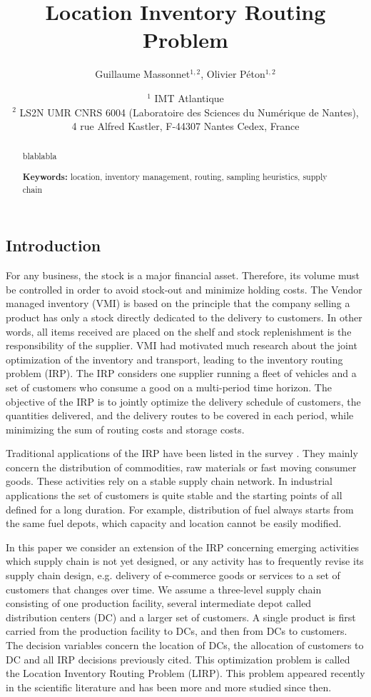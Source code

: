 \documentclass[a4paper,10pt]{article}
\title{Location Inventory Routing Problem}
\author{Guillaume Massonnet$^{1,2}$, Olivier P\'eton$^{1,2}$}
\date{$^1$ IMT Atlantique\\ 
	$^2$ LS2N UMR CNRS 6004 (Laboratoire des Sciences du Numérique de Nantes), \\ 4 rue Alfred Kastler, F-44307 Nantes Cedex, France}
\begin{document}
	
\maketitle


\begin{abstract}
	blablabla
	
\textbf{Keywords:}		location, inventory management, routing, sampling heuristics, supply chain
	
\end{abstract}

\modulolinenumbers[5]
\linenumbers
\begin{linenumbers}


\section{Introduction}

For any business, the stock is a major financial asset. 
Therefore, its volume must be controlled in order to avoid stock-out and minimize holding costs. 
The Vendor managed inventory (VMI) is based on the principle that the company selling a product has only a stock directly dedicated to the delivery to customers. In other words, all items received are placed on the shelf and stock replenishment is the responsibility of the supplier. VMI had motivated much research about the joint optimization of the inventory and transport, leading to the inventory routing problem (IRP). The IRP considers one supplier running a fleet of vehicles and a set of customers who consume a good on a multi-period time horizon. The objective of the IRP is to jointly optimize the delivery schedule of customers, the quantities delivered, and the delivery routes to be covered in each period, while minimizing the sum of routing costs and storage costs.

Traditional applications of the IRP have been listed in the survey \cite{Coelho2014}. They mainly concern the distribution of commodities, raw materials or fast moving consumer goods. These activities rely on a stable supply chain network. 
In industrial applications the set of customers is quite stable and the starting points of all defined for a long duration.
For example, distribution of fuel always starts from the same fuel depots, which capacity and location cannot be easily modified. 

In this paper we consider an extension of the IRP concerning emerging activities which supply chain is not yet designed, 
or any activity has to frequently revise its supply chain design, e.g. delivery of e-commerce goods or services to a set of customers that changes over time. We assume a three-level supply chain consisting of one production facility, several intermediate depot called distribution centers (DC) and a larger set of customers. A single product is first carried from the production facility to DCs, and then from DCs to customers. The decision variables concern the location of DCs, the allocation of customers to DC and all IRP decisions previously cited. 
This optimization problem is called the Location Inventory Routing Problem (LIRP). This problem appeared recently in the scientific literature \citep{AhmadiJavid2010} and has been more and more studied since then. 


\end{linenumbers}
\end{document}
